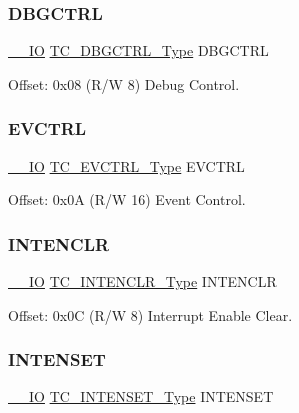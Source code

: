 \subsubsection{\texorpdfstring{DBGCTRL}{DBGCTRL}}
{\footnotesize\ttfamily \mbox{\hyperlink{core__cm0plus_8h_aec43007d9998a0a0e01faede4133d6be}{\+\_\+\+\_\+\+IO}} \mbox{\hyperlink{union_t_c___d_b_g_c_t_r_l___type}{T\+C\+\_\+\+D\+B\+G\+C\+T\+R\+L\+\_\+\+Type}} D\+B\+G\+C\+T\+RL}



Offset\+: 0x08 (R/W 8) Debug Control. 

\mbox{\label{struct_tc_count32_a5c530ba15b26365374f61a17c7cf5058}} 
\subsubsection{\texorpdfstring{EVCTRL}{EVCTRL}}
{\footnotesize\ttfamily \mbox{\hyperlink{core__cm0plus_8h_aec43007d9998a0a0e01faede4133d6be}{\+\_\+\+\_\+\+IO}} \mbox{\hyperlink{union_t_c___e_v_c_t_r_l___type}{T\+C\+\_\+\+E\+V\+C\+T\+R\+L\+\_\+\+Type}} E\+V\+C\+T\+RL}



Offset\+: 0x0A (R/W 16) Event Control. 

\mbox{\label{struct_tc_count32_a1076512cb13382301c336e0646e655f6}} 
\subsubsection{\texorpdfstring{INTENCLR}{INTENCLR}}
{\footnotesize\ttfamily \mbox{\hyperlink{core__cm0plus_8h_aec43007d9998a0a0e01faede4133d6be}{\+\_\+\+\_\+\+IO}} \mbox{\hyperlink{union_t_c___i_n_t_e_n_c_l_r___type}{T\+C\+\_\+\+I\+N\+T\+E\+N\+C\+L\+R\+\_\+\+Type}} I\+N\+T\+E\+N\+C\+LR}



Offset\+: 0x0C (R/W 8) Interrupt Enable Clear. 

\mbox{\label{struct_tc_count32_a59e384762759e5950e3d32d1f3b358d6}} 
\subsubsection{\texorpdfstring{INTENSET}{INTENSET}}
{\footnotesize\ttfamily \mbox{\hyperlink{core__cm0plus_8h_aec43007d9998a0a0e01faede4133d6be}{\+\_\+\+\_\+\+IO}} \mbox{\hyperlink{union_t_c___i_n_t_e_n_s_e_t___type}{T\+C\+\_\+\+I\+N\+T\+E\+N\+S\+E\+T\+\_\+\+Type}} I\+N\+T\+E\+N\+S\+ET}



